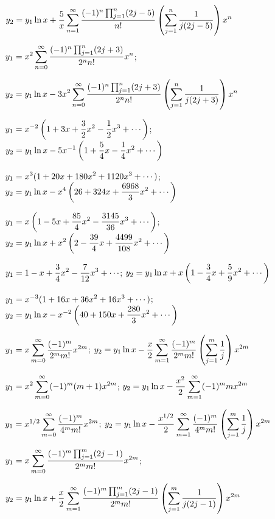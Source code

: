 \quad\;  \;\;\;
$\displaystyle{y_{2}=y_{1}\ln
x+\frac{5}{x}\sum_{n=1}^{\infty}\frac{(-1)^{n}\prod_{j=1}^{n}(2j-5)}{n!}
\left(\sum_{j=1}^{n}\frac{1}{j(2j-5)}\right)x^{n}}$

$\displaystyle{y_{1}=x^{2}\sum_{n=0}^{\infty}
\frac{(-1)^{n}\prod_{j=1}^{n}(2j+3)}{2^{n}n!}x^{n}}$;\;

\quad\;  \;\;\;
$\displaystyle{y_{2}=y_{1}\ln x-3x^{2}\sum_{n=0}^{\infty}
\frac{(-1)^{n}\prod_{j=1}^{n}(2j+3)}{2^{n}n!}
\left(\sum_{j=1}^{n}\frac{1}{j(2j+3)}\right)x^{n}}$\;

$\displaystyle{y_{1}=x^{-2}\left(1+3x+\frac{3}{2}x^{2}-\frac{1}{2}x^{3}+\cdots\right)}$;\;
$\displaystyle{y_{2}=y_{1}\ln
x-5x^{-1}\left(1+\frac{5}{4}x-\frac{1}{4}x^{2}+\cdots\right)}$

$\displaystyle{y_{1}=x^{3}(1+20x+180x^{2}+1120x^{3}+\cdots)}$;\;
$\displaystyle{y_{2}=y_{1}\ln
x-x^{4}\left(26+324x+\frac{6968}{3}x^{2}+\cdots\right)}$

$\displaystyle{y_{1}=x\left(1-5x+\frac{85}{4}x^{2}-\frac{3145}{36}x^{3}+\cdots\right)}$;\;
$\displaystyle{y_{2}=
y_{1}\ln
x+x^{2}\left(2-\frac{39}{4}x+\frac{4499}{108}x^{2}+\cdots\right)}$

$\displaystyle{y_{1}=1-x+\frac{3}{4}x^{2}-\frac{7}{12}x^{3}+\cdots}$;\;
$\displaystyle{y_{2}=y_{1}\ln
x+x\left(1-\frac{3}{4}x+\frac{5}{9}x^{2}+\cdots\right)}$

$\displaystyle{y_{1}=x^{-3}(1+16x+36x^{2}+16x^{3}+\cdots)}$;\;
$\displaystyle{y_{2}=y_{1}\ln
x-x^{-2}\left(40+150x+\frac{280}{3}x^{2}+\cdots\right)}$

$\displaystyle{y_{1}=x\sum_{m=0}^{\infty}\frac{(-1)^{m}}{2^{m}m!}x^{2m}}$;\;
$\displaystyle{y_{2}=y_{1}\ln x-\frac{x}{2}\sum_{m=1}^{\infty}\frac{(-1)^{m}}{2^{m}m!}\left(\sum_{j=1}^{m}\frac{1}{j}\right)x^{2m}}$

$\displaystyle{y_{1}=x^{2}\sum_{m=0}^{\infty}(-1)^{m}(m+1)x^{2m}}$;\;
$\displaystyle{y_{2}=y_{1}\ln x-\frac{x^{2}}{2}\sum_{m=1}^{\infty}(-1)^{m}mx^{2m}}$

$\displaystyle{y_{1}=x^{1/2}\sum_{m=0}^{\infty}\frac{(-1)^{m}}{4^{m}m!}x^{2m}}$;\;
$\displaystyle{y_{2}=y_{1}\ln x-\frac{x^{1/2}}{2}\sum_{m=1}^{\infty}\frac{(-1)^{m}}{4^{m}m!}\left(\sum_{j=1}^{m}\frac{1}{j}\right)x^{2m}}$

$\displaystyle{y_{1}=x\sum_{m=0}^{\infty}\frac{(-1)^{m}\prod_{j=1}^{m}(2j-1)}{2^{m}m!}
x^{2m}}$;\;

\quad\;  \;\;\;
$\displaystyle{y_{2}=y_{1}\ln
x+\frac{x}{2}\sum_{m=1}^{\infty}\frac{(-1)^{m}\prod_{j=1}^{m}(2j-1)}{2^{m}m!}
\left(\sum_{j=1}^{m}\frac{1}{j(2j-1)}\right)x^{2m}}$

